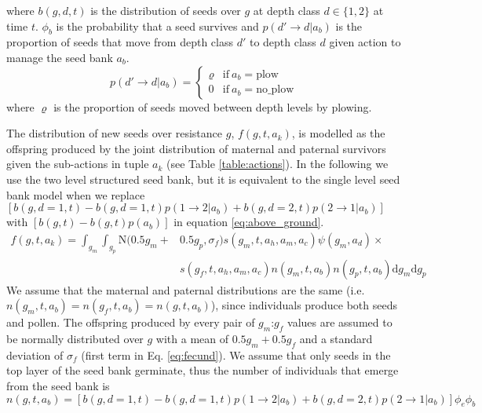 \documentclass[12pt, a4paper]{article}
\begin{document}
where $b(g, d, t)$ is the distribution of seeds over $g$ at depth class $d \in \{1, 2\}$ at time $t$. $\phi_b$ is the probability that a seed survives and $p(d' \rightarrow d|a_b)$ is the proportion of seeds that move from depth class $d'$ to depth class $d$ given action to manage the seed bank $a_b$.    
\begin{equation}
	p(d' \rightarrow d|a_b) = \begin{cases}
		\varrho &\text{if}~a_b = \text{plow} \\
		0 &\text{if}~a_b = \text{no\_plow}
	\end{cases}
\end{equation}  
where $\varrho$ is the proportion of seeds moved between depth levels by plowing. 
   
The distribution of new seeds over resistance $g$, $f(g, t, a_k)$, is modelled as the offspring produced by the joint distribution of maternal and paternal survivors given the sub-actions in tuple $a_k$ (see Table \ref{table:actions}). In the following we use the two level structured seed bank, but it is equivalent to the single level seed bank model when we replace $[b(g, d = 1, t) - b(g, d = 1, t)p(1 \rightarrow 2|a_b) + b(g, d = 2, t)p(2 \rightarrow 1|a_b)]$ with $[b(g, t) - b(g, t)p(a_b)]$ in equation \ref{eq:above_ground}.        
\begin{equation}
\label{eq:fecund}
\begin{split}
	f(g, t, a_k) = \displaystyle\int_{g_m}\int_{g_p} \text{N}(0.5 g_m + &0.5 g_p, \sigma_f)s(g_m, t, a_h, a_m, a_c)\psi(g_m,a_d)\times \\ 
		&s(g_f, t, a_h, a_m, a_c)n(g_m, t, a_b)n(g_p, t, a_b)\text{d}g_m\text{d}g_p 
\end{split}
\end{equation}
We assume that the maternal and paternal distributions are the same (i.e. $n(g_m, t, a_b) = n(g_f, t, a_b) = n(g, t, a_b)$), since individuals produce both seeds and pollen. The offspring produced by every pair of $g_m$:$g_f$ values are assumed to be normally distributed over $g$ with a mean of $0.5g_m + 0.5g_f$ and a standard deviation of $\sigma_f$ (first term in Eq. \ref{eq:fecund}). We assume that only seeds in the top layer of the seed bank germinate, thus the number of individuals that emerge from the seed bank is
\begin{equation}\label{eq:above_ground}
	n(g, t, a_b) = [b(g, d = 1, t) - b(g, d = 1, t)p(1 \rightarrow 2|a_b) + b(g, d = 2, t)p(2 \rightarrow 1|a_b)]\phi_e\phi_b
\end{equation}
\end{document}
